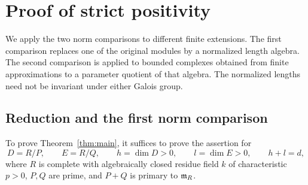 \section{Proof of strict positivity}\label{sec:positivity}

We apply the two norm comparisons to different finite extensions.  The
first comparison replaces one of the original modules by a normalized
length algebra.  The second comparison is applied to bounded complexes
obtained from finite approximations to a parameter quotient of that
algebra.  The normalized lengths need not be invariant under either
Galois group.

\subsection{Reduction and the first norm comparison}

\begin{lemma}\label{pos:reduction}
To prove Theorem~\ref{thm:main}, it suffices to prove the assertion for
\[
 D=R/P,\qquad E=R/Q,\qquad
 h=\dim D>0,\qquad l=\dim E>0,\qquad h+l=d,
\]
where $R$ is complete with algebraically closed residue field $k$ of
characteristic $p>0$, $P,Q$ are prime, and $P+Q$ is primary to $\mathfrak{m}_R$.
\end{lemma}


